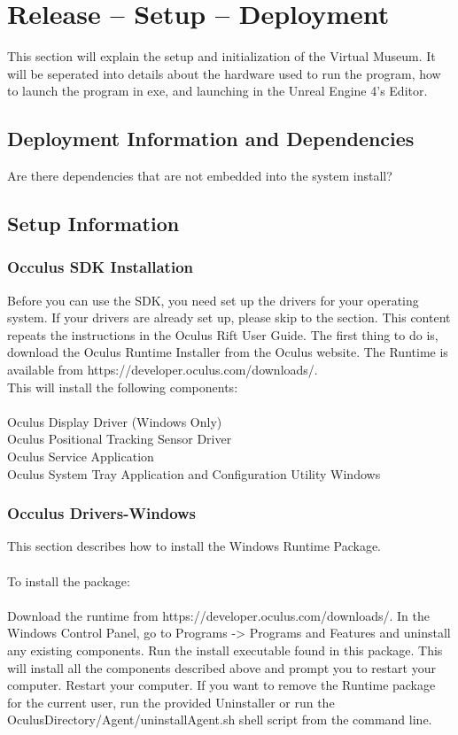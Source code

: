 \chapter{Release -- Setup -- Deployment}
This section will explain the setup and initialization of the Virtual Museum. It will be seperated into details about the hardware used to run the program, how to launch the program in exe, and launching in the Unreal Engine 4's Editor.


\section{Deployment Information and Dependencies}
Are there dependencies that are not embedded into the system install? 



\section{Setup Information}

\subsection{Occulus SDK Installation}
Before you can use the SDK, you need set up the drivers for your operating system. If your drivers are already set up, please skip to the  section. This content repeats the instructions in the Oculus Rift User Guide. The first thing to do is, download the Oculus Runtime Installer from the Oculus website. The Runtime is available from https://developer.oculus.com/downloads/.
\\ This will install the following components:
\\
\\Oculus Display Driver (Windows Only)
\\ Oculus Positional Tracking Sensor Driver
\\ Oculus Service Application
\\ Oculus System Tray Application and Configuration Utility Windows
\\

\subsection{Occulus Drivers-Windows}

This section describes how to install the Windows Runtime Package.
\\
\\To install the package:
\\
\\
Download the runtime from https://developer.oculus.com/downloads/. In the Windows Control Panel, go to Programs -> Programs and Features and uninstall any existing components. Run the install executable found in this package. This will install all the components described above and prompt you to restart your computer. Restart your computer. If you want to remove the Runtime package for the current user, run the provided Uninstaller or run the OculusDirectory/Agent/uninstallAgent.sh shell script from the command line.


